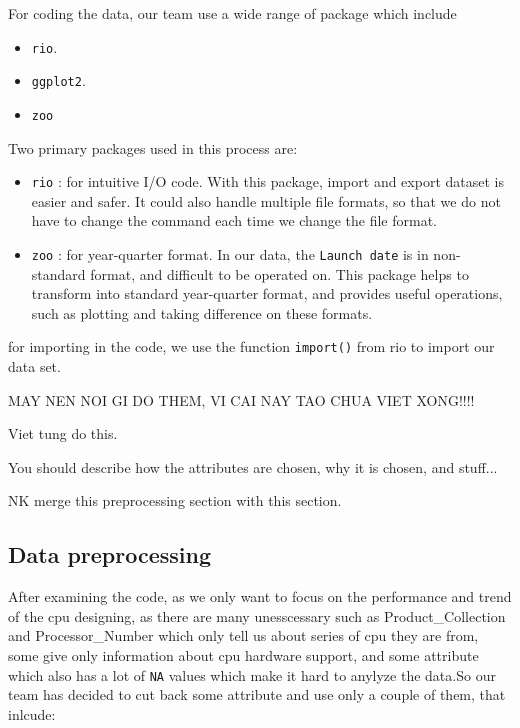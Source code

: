 For coding the data, our team use a wide range of package which include 
\begin{itemize}
    \item \verb|rio|.
    \item \verb|ggplot2|.
    \item \verb|zoo|
\end{itemize}

Two primary packages used in this process are:

\begin{itemize}
    \item \verb|rio| : for intuitive I/O code.
    With this package, import and export dataset is easier and safer. It could 
    also handle multiple file formats, so that we do not have to
    change the command each time we change the file format.

    \item \verb|zoo| : for year-quarter format.
    In our data, the \verb|Launch date| is in non-standard format, and difficult to be operated on. This package helps to transform
    into standard year-quarter format, and provides useful operations, such as plotting and taking difference on these formats.

\end{itemize}


for importing in the code, we use the function \texttt{import()} from rio to import our data set.


MAY NEN NOI GI DO THEM, VI CAI NAY TAO CHUA VIET XONG!!!!

Viet tung do this.

You should describe how the attributes are chosen, why it is chosen, and stuff...

NK merge this preprocessing section with this section.
\subsection{Data preprocessing}

After examining the code, as we only want to focus on the performance and trend of the cpu designing, as there are many unesscessary such as Product\_Collection and Processor\_Number which only tell us about series of cpu they are from, some give only information about cpu hardware support, and some attribute which also has a lot of \texttt{NA} values which make it hard to anylyze the data.So our team has decided to cut back some attribute and use only a couple of them, that inlcude:

